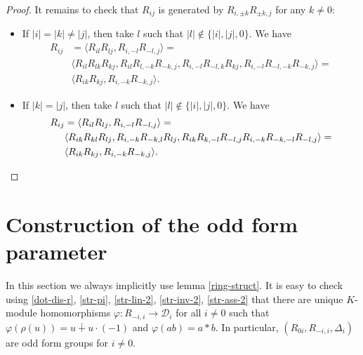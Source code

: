 \documentclass{article}
\theoremstyle{definition}
\begin{document}
\begin{proof}
    It remains to check that \(R_{ij}\) is generated by \(R_{i, \pm k} R_{\pm k, j}\) for any \(k \neq 0\):
    \begin{itemize}

        \item If \(
            |i| = |k| \neq |j|
        \), then take \(l\) such that \(
            |l| \notin \{|i|, |j|, 0\}
        \). We have
        \begin{align*}
            R_{ij}
            &=
            \langle
                R_{il} R_{lj},
                R_{i, -l} R_{-l, j}
            \rangle
            =\\
            &\langle
                R_{il} R_{lk} R_{kj},
                R_{il} R_{l, -k} R_{-k, j},
                R_{i, -l} R_{-l, k} R_{kj},
                R_{i, -l} R_{-l, -k} R_{-k, j}
            \rangle
            =\\
            &\langle
                R_{ik} R_{kj},
                R_{i, -k} R_{-k, j}
            \rangle.
        \end{align*}

        \item If \(
            |k| = |j|
        \), then take \(l\) such that \(
        |l| \notin \{|i|, |j|, 0\}
        \). We have
        \begin{align*}
            R_{ij}
            &=
            \langle
                R_{il} R_{lj},
                R_{i, -l} R_{-l, j}
            \rangle
            =\\
            &\langle
                R_{ik} R_{kl} R_{lj},
                R_{i, -k} R_{-k, l} R_{lj},
                R_{ik} R_{k, -l} R_{-l, j}
                R_{i, -k} R_{-k, -l} R_{-l, j}
            \rangle
            =\\
            &\langle
                R_{ik} R_{kj},
                R_{i, -k} R_{-k, j}
            \rangle.
        \qedhere\end{align*}

    \end{itemize}
\end{proof}



\section{Construction of the odd form parameter}

In this section we always implicitly use lemma \ref{ring-struct}. It is easy to check using \ref{dot-dis-r}, \ref{str-pi}, \ref{str-lin-2}, \ref{str-inv-2}, \ref{str-ass-2} that there are unique \(K\)-module homomorphisms \(
    \varphi \colon R_{-i, i} \to \mathcal D_i
\) for all \(i \neq 0\) such that \(
    \varphi(\rho(u)) = u \dotplus u \cdot (-1)
\) and \(
    \varphi(ab) = a * b
\). In particular, \(
    (R_{0i}, R_{-i, i}, \Delta_i)
\) are odd form groups for \(i \neq 0\).
\end{document}
